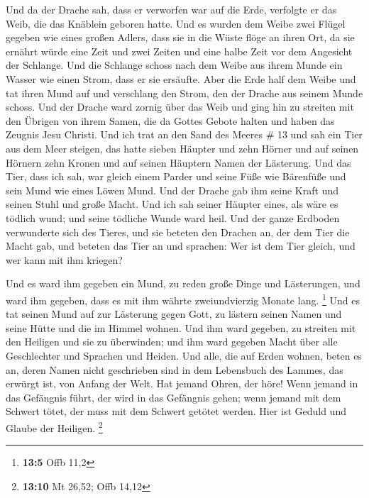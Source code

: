  Und da der Drache sah, dass er verworfen war auf die Erde,
verfolgte er das Weib, die das Knäblein geboren hatte.  Und
es wurden dem Weibe zwei Flügel gegeben wie eines großen Adlers, dass
sie in die Wüste flöge an ihren Ort, da sie ernährt würde eine Zeit und
zwei Zeiten und eine halbe Zeit vor dem Angesicht der Schlange.
 Und die Schlange schoss nach dem Weibe aus ihrem Munde ein
Wasser wie einen Strom, dass er sie ersäufte.  Aber die
Erde half dem Weibe und tat ihren Mund auf und verschlang den Strom, den
der Drache aus seinem Munde schoss.  Und der Drache ward
zornig über das Weib und ging hin zu streiten mit den Übrigen von ihrem
Samen, die da Gottes Gebote halten und haben das Zeugnis Jesu Christi.
 Und ich trat an den Sand des Meeres \# 13  und
sah ein Tier aus dem Meer steigen, das hatte sieben Häupter und zehn
Hörner und auf seinen Hörnern zehn Kronen und auf seinen Häuptern Namen
der Lästerung.  Und das Tier, dass ich sah, war gleich einem
Parder und seine Füße wie Bärenfüße und sein Mund wie eines Löwen Mund.
Und der Drache gab ihm seine Kraft und seinen Stuhl und große Macht.
 Und ich sah seiner Häupter eines, als wäre es tödlich wund;
und seine tödliche Wunde ward heil. Und der ganze Erdboden verwunderte
sich des Tieres,  und sie beteten den Drachen an, der dem
Tier die Macht gab, und beteten das Tier an und sprachen: Wer ist dem
Tier gleich, und wer kann mit ihm kriegen?

 Und es ward ihm gegeben ein Mund, zu reden große Dinge und
Lästerungen, und ward ihm gegeben, dass es mit ihm währte zweiundvierzig
Monate lang. \footnote{\textbf{13:5} Offb 11,2}  Und es tat
seinen Mund auf zur Lästerung gegen Gott, zu lästern seinen Namen und
seine Hütte und die im Himmel wohnen.  Und ihm ward gegeben,
zu streiten mit den Heiligen und sie zu überwinden; und ihm ward gegeben
Macht über alle Geschlechter und Sprachen und Heiden.  Und
alle, die auf Erden wohnen, beten es an, deren Namen nicht geschrieben
sind in dem Lebensbuch des Lammes, das erwürgt ist, von Anfang der Welt.
 Hat jemand Ohren, der höre!  Wenn jemand in
das Gefängnis führt, der wird in das Gefängnis gehen; wenn jemand mit
dem Schwert tötet, der muss mit dem Schwert getötet werden. Hier ist
Geduld und Glaube der Heiligen. \footnote{\textbf{13:10} Mt 26,52; Offb
  14,12}

